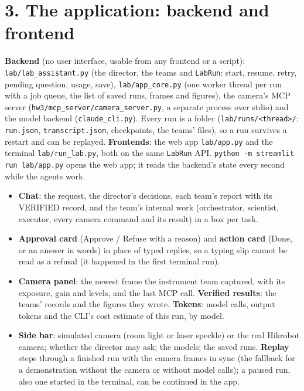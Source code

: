 \documentclass[11pt,a4paper]{article}
\begin{document}
\section*{3. The application: backend and frontend}
\textbf{Backend} (no user interface, usable from any frontend or a script): \texttt{lab/lab\_assistant.py} (the director,
the teams and \texttt{LabRun}: start, resume, retry, pending question, usage, save), \texttt{lab/app\_core.py} (one worker
thread per run with a job queue, the list of saved runs, frames and figures), the camera's MCP server
(\texttt{hw3/mcp\_server/camera\_server.py}, a separate process over stdio) and the model backend
(\texttt{claude\_cli.py}). Every run is a folder (\texttt{lab/runs/<thread>/}: \texttt{run.json}, \texttt{transcript.json},
checkpoints, the teams' files), so a run survives a restart and can be replayed. \textbf{Frontends}: the web app
\texttt{lab/app.py} and the terminal \texttt{lab/run\_lab.py}, both on the same \texttt{LabRun} API.
\texttt{python -m streamlit run lab/app.py} opens the web app; it reads the backend's state every second while the
agents work.
\begin{itemize}[leftmargin=*,itemsep=1pt]
\item \textbf{Chat}: the request, the director's decisions, each team's report with its VERIFIED record, and the team's
  internal work (orchestrator, scientist, executor, every camera command and its result) in a box per task.
\item \textbf{Approval card} (Approve / Refuse with a reason) and \textbf{action card} (Done, or an answer in words) in
  place of typed replies, so a typing slip cannot be read as a refusal (it happened in the first terminal run).
\item \textbf{Camera panel}: the newest frame the instrument team captured, with its exposure, gain and levels, and the
  last MCP call. \textbf{Verified results}: the teams' records and the figures they wrote. \textbf{Tokens}: model calls,
  output tokens and the CLI's cost estimate of this run, by model.
\item \textbf{Side bar}: simulated camera (room light or laser speckle) or the real Hikrobot camera; whether the director
  may ask; the models; the saved runs. \textbf{Replay} steps through a finished run with the camera frames in sync (the
  fallback for a demonstration without the camera or without model calls); a paused run, also one started in the
  terminal, can be continued in the app.
\end{itemize}
\end{document}
